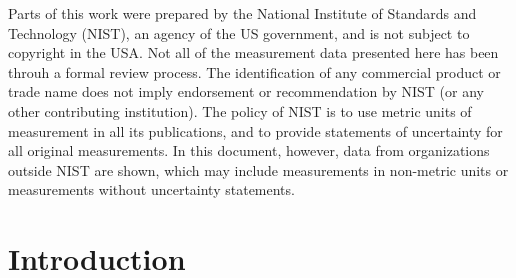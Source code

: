 \documentclass{book}
\begin{document}
Parts of this work were prepared by the National Institute of Standards and Technology (NIST), an agency of the US government, and is not subject to copyright in the USA. Not all of the measurement data presented here has been throuh a formal review process. The identification of any commercial product or trade name does not imply endorsement or recommendation by NIST (or any other contributing institution). The policy of NIST is to use metric units of measurement in all its publications, and to provide statements of uncertainty for all original measurements. In this document, however, data from organizations outside NIST are shown, which may include measurements in non-metric units or measurements without uncertainty statements.

\newpage

\tableofcontents

\mainmatter

\pagestyle{fancy}

\chapter{Introduction}
\end{document}
